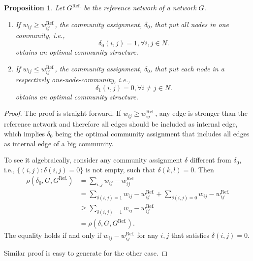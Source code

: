 \documentclass[11pt]{article}
\theoremstyle{definition}
\theoremstyle{definition}
\theoremstyle{definition}
\theoremstyle{remark}
\theoremstyle{plain}
\newtheorem{prop}[defn]{Proposition}
\begin{document}
\begin{prop}
	Let $G^{\text{Ref.}}$ be the reference network of a network $G$. 
	\begin{enumerate}
		\item If $w_{ij} \geq w_{ij}^{\text{Ref.}}$, the community assignment, $\delta_0$, that put all nodes in one community, i.e.,
		\begin{equation}\label{eq:delta-0}
			\delta_0(i,j) = 1, \forall i,j\in N.
		\end{equation}
		obtains an optimal community structure.
		\item If $w_{ij} \leq w_{ij}^{\text{Ref.}}$, the community assignment, $\delta_0$, that put each node in a respectively one-node-community, i.e.,
		\begin{equation}\label{eq:delta-1}
			\delta_1(i,j) = 0, \forall i\neq j\in N.
		\end{equation}
		obtains an optimal community structure.
	\end{enumerate}
\end{prop}
\begin{proof}
	The proof is straight-forward. If $w_{ij} \geq w_{ij}^{\text{Ref.}}$, any edge is stronger than the reference network and therefore all edges should be included as internal edge, which implies $\delta_0$ being the optimal community assignment that includes all edges as internal edge of a big community. 

	To see it algebraically, consider any community assignment $\delta$ different from $\delta_0$, i.e., $\{(i,j):\delta(i,j) = 0\}$ is not empty, such that $\delta(k, l) = 0$. Then
	\[
		\begin{aligned}
			\rho(\delta_0,G, G^{\text{Ref.}}) &= \sum_{i,j} w_{ij}-w^{\text{Ref.}}_{ij}\\
			&=\sum_{\delta(i,j) = 1} w_{ij}-w^{\text{Ref.}}_{ij} + \sum_{\delta(i,j) = 0} w_{ij}-w^{\text{Ref.}}_{ij}\\
			&\geq \sum_{\delta(i,j) = 1} w_{ij}-w^{\text{Ref.}}_{ij}\\
			&=\rho(\delta, G, G^{\text{Ref.}}).
		\end{aligned}
	\]
	The equality holds if and only if $ w_{ij}-w^{\text{Ref.}}_{ij}$ for any $i,j$ that satisfies $\delta(i,j) = 0$.

	Similar proof is easy to generate for the other case.
\end{proof}
\end{document}
